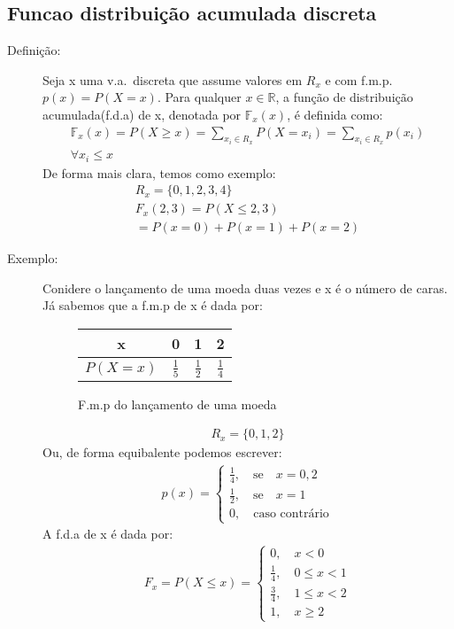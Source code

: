\documentclass[11pt,a4paper]{book}
\begin{document}
 \subsection{Funcao distribuição acumulada discreta}
 \begin{description}
   \item [Definição:] Seja x uma v.a.\ discreta que assume valores em $R_{x}$ e com f.m.p.\
     $p(x)=P(X=x)$. Para qualquer $x \in \mathbb{R}$, a função de distribuição 
     acumulada(f.d.a) de x, denotada por $\mathbb{F}_{x}(x)$, é definida como: 
     \begin{align}
       \mathbb{F}_{x}(x)=P(X \geq x )= \sum_{x_{i} \in R_{x}} P(X=x_i) = \sum_{x_{i} \in R_{x}} p(x_i) \\
       \forall x_i \le x \nonumber
     \end{align}
     De forma mais clara, temos como exemplo: 
     \begin{align*}
       R_{x}= \{0,1,2,3,4 \}\\
       F_{x}(2,3)= P(X\le 2,3)\\
       = P(x=0)+P(x=1)+P(x=2)
     \end{align*}
   \item [Exemplo: ]
     Conidere o lançamento de uma moeda duas vezes e x é o número de caras. Já sabemos
     que a f.m.p de x é dada por:
     \begin{figure} 
       \centering
       \begin{tabular}{c c c c}
         \toprule
         x&0&1&2\\ \midrule
         $P(X=x)$&$\frac{1}{5}$&$\frac{1}{2}$&$\frac{1}{4}$\\ \bottomrule
       \end{tabular}
       \label{tab:5}
       \caption{F.m.p do lançamento de uma moeda}
     \end{figure}
     \begin{align*}
       R_{x}=\{0,1,2\}
     \end{align*}
     Ou, de forma equibalente podemos escrever: 
     \begin{align*}
       p(x)=
       \begin{cases}
         \frac{1}{4}, \quad \text{se} \quad x=0,2\\
         \frac{1}{2}, \quad \text{se} \quad x=1\\
         0,\quad  \text{caso contrário}
       \end{cases}
     \end{align*}
     A f.d.a de x é dada por:
     \begin{align*}
       F_{x}=P(X\le x)= 
       \begin{cases}
         0,\quad  x<0 \\
         \frac{1}{4}, \quad 0 \le x <1\\
         \frac{3}{4}, \quad 1 \le x < 2\\
         1, \quad x \geq 2
       \end{cases}
     \end{align*}
 \end{description}
\end{document}
